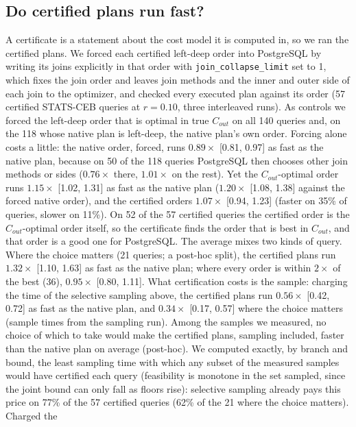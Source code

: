 \documentclass[sigconf, nonacm]{acmart}
\begin{document}
\subsection{Do certified plans run fast?}
A certificate is a statement about the cost model it is computed in, so we ran
the certified plans. We forced each certified left-deep order into PostgreSQL by
writing its joins explicitly in that order with \texttt{join\_collapse\_limit}
set to 1, which fixes the join order and leaves join methods and the inner and
outer side of each join to the optimizer, and checked every executed plan
against its order (57 certified STATS-CEB queries at $r{=}0.10$, three
interleaved runs). As controls we forced the left-deep order that is optimal in
true $C_{out}$ on all 140 queries and, on the 118 whose native plan is
left-deep, the native plan's own order. Forcing alone costs a little: the
native order, forced, runs $0.89\times$ [0.81, 0.97] as fast as the native
plan, because on 50 of the 118 queries PostgreSQL then chooses other join
methods or sides ($0.76\times$ there, $1.01\times$ on the rest). Yet the
$C_{out}$-optimal order runs $1.15\times$ [1.02, 1.31] as fast as the native
plan ($1.20\times$ [1.08, 1.38] against the forced native order), and the
certified orders $1.07\times$ [0.94, 1.23] (faster on 35\% of queries, slower
on 11\%). On 52 of the 57 certified queries the certified order is the
$C_{out}$-optimal order itself, so the certificate finds the order that is
best in $C_{out}$, and that order is a good one for PostgreSQL. The average
mixes two kinds of query. Where the choice matters (21 queries; a post-hoc
split), the certified plans run
$1.32\times$ [1.10, 1.63] as fast as the native plan; where every order is
within $2\times$ of the best (36), $0.95\times$ [0.80, 1.11]. What
certification costs is the sample: charging the time of the selective sampling above, the certified
plans run $0.56\times$ [0.42, 0.72] as fast as the native plan, and
$0.34\times$ [0.17, 0.57] where the choice matters (sample times from the
sampling run). Among the samples we measured, no choice of which to take would
make the certified plans, sampling included, faster than the native plan on
average (post-hoc). We computed exactly, by branch and bound, the least sampling time
with which any subset of the measured samples would have certified each query
(feasibility is monotone in the set sampled, since the joint bound can only fall
as floors rise): selective sampling already pays this price on 77\% of the 57
certified queries (62\% of the 21 where the choice matters). Charged the
\end{document}
